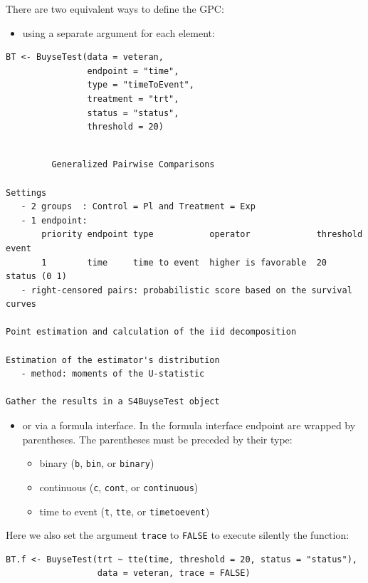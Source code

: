 \documentclass[12pt]{article}
\begin{document}
\bigskip

There are two equivalent ways to define the GPC: 
\begin{itemize}
\item using a separate argument for each element:
\end{itemize}

\lstset{language=r,label= ,caption= ,captionpos=b,numbers=none}
\begin{lstlisting}
BT <- BuyseTest(data = veteran, 
                endpoint = "time", 
                type = "timeToEvent", 
                treatment = "trt", 
                status = "status", 
                threshold = 20)
\end{lstlisting}

\begin{verbatim}

         Generalized Pairwise Comparisons

Settings 
   - 2 groups  : Control = Pl and Treatment = Exp
   - 1 endpoint: 
       priority endpoint type           operator             threshold event       
       1        time     time to event  higher is favorable  20        status (0 1)
   - right-censored pairs: probabilistic score based on the survival curves 

Point estimation and calculation of the iid decomposition

Estimation of the estimator's distribution 
   - method: moments of the U-statistic

Gather the results in a S4BuyseTest object
\end{verbatim}

\clearpage

\begin{itemize}
\item or via a formula interface. In the formula interface endpoint are
wrapped by parentheses. The parentheses must be preceded by their
type: 
\begin{itemize}[label={-}]
\item binary (\texttt{b}, \texttt{bin}, or \texttt{binary})
\item continuous (\texttt{c}, \texttt{cont}, or  \texttt{continuous})
\item time to event (\texttt{t}, \texttt{tte}, or \texttt{timetoevent})
\end{itemize}
\end{itemize}
Here we also set the argument \texttt{trace} to \texttt{FALSE} to execute silently
the function:
\lstset{language=r,label= ,caption= ,captionpos=b,numbers=none}
\begin{lstlisting}
BT.f <- BuyseTest(trt ~ tte(time, threshold = 20, status = "status"),
                  data = veteran, trace = FALSE)
\end{lstlisting}
\end{document}
